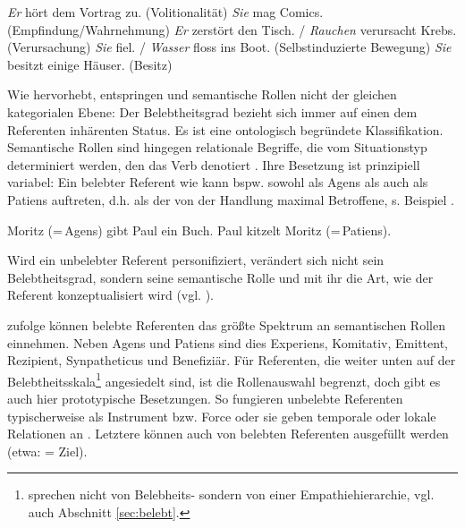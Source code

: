 \begin{exe}
\ex \label{ex:proto-agens}
	\begin{xlist}
        \ex  \textit{Er} hört dem Vortrag zu. (Volitionalität)
        \ex  \textit{Sie} mag Comics. (Empfindung/Wahrnehmung)
        \ex \textit{Er} zerstört den Tisch. / \textit{Rauchen} verursacht Krebs. (Verursachung)
        \ex  \textit{Sie} fiel. / \textit{Wasser} floss ins Boot. (Selbstinduzierte Bewegung)
        \ex  \textit{Sie} besitzt einige Häuser. (Besitz)
	\end{xlist}
\end{exe}

Wie \textcite[][151--152]{Yamamoto1999} hervorhebt, entspringen  und semantische Rollen  nicht der gleichen kategorialen Ebene: Der Belebtheitsgrad   bezieht sich immer auf einen dem Referenten inhärenten Status. Es ist eine ontologisch begründete Klassifikation. Semantische Rollen  sind hingegen relationale Begriffe, die vom Situationstyp determiniert werden, den das Verb denotiert \parencite[13]{Lehmann2004a}. Ihre Besetzung ist prinzipiell variabel: Ein belebter  Referent wie  kann bspw. sowohl als Agens  als auch als Patiens auftreten, d.h. als der von der Handlung maximal Betroffene, s. Beispiel . 
 
\begin{exe}
	\ex \label{ex:rollen}
	\begin{xlist}
	 	\ex Moritz (=\,Agens) gibt Paul ein Buch.
		\ex Paul kitzelt Moritz (=\,Patiens).
 
	\end{xlist}
\end{exe}
\noindent
 
Wird ein unbelebter  Referent personifiziert, verändert sich nicht sein  Belebtheitsgrad, sondern seine semantische Rolle  und mit ihr die Art, wie der Referent konzeptualisiert wird (vgl. ). 

\textcite[12]{Lehmann2004a} zufolge können belebte  Referenten das größte Spektrum an semantischen Rollen  einnehmen. Neben Agens  und Patiens sind dies Experiens, Komitativ, Emittent, Rezipient, Synpatheticus und Benefiziär.  Für Referenten, die weiter unten auf der Belebtheitsskala\footnote{\textcite{Lehmann2004a} sprechen nicht von Belebheits- sondern  von einer 
Empathiehierarchie, vgl. auch Abschnitt \ref{sec:belebt}.} angesiedelt sind, ist die Rollenauswahl  begrenzt, doch gibt es auch hier prototypische Besetzungen. So fungieren unbelebte  Referenten typischerweise als Instrument bzw. Force oder sie geben temporale oder lokale Relationen an \parencite[76]{Primus2012}. Letztere können auch von belebten  Referenten ausgefüllt werden (etwa:  = Ziel). 

